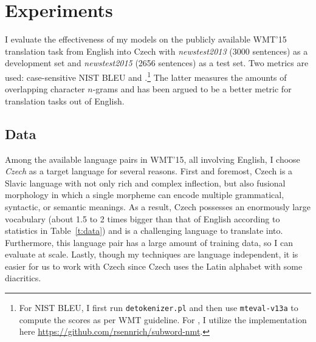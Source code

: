 \section{Experiments}
\label{sec:exp}
I evaluate the effectiveness of my models on the publicly available WMT'15
translation task from English into Czech with 
{\it newstest2013} (3000 sentences) as
a development set %
and {\it newstest2015} (2656 sentences) as a test set. Two metrics are used: case-sensitive NIST BLEU \cite{Papineni02bleu}
and \chr{} \cite{chrf}.\footnote{For NIST BLEU, I first run
\texttt{detokenizer.pl} %
and then use \texttt{mteval-v13a}
to compute the scores as per WMT guideline. For \chr{}, I utilize the implementation here
\url{https://github.com/rsennrich/subword-nmt}.}
The latter measures the amounts of overlapping character $n$-grams and has
been argued to be a better metric for translation tasks out of English.

\subsection{Data}
Among the available language pairs in WMT'15, all involving English, 
I choose {\it Czech} as a target language for several reasons. First and
foremost, Czech is a Slavic language with not only rich
and complex inflection,
but also fusional morphology in which a single morpheme can encode multiple
grammatical, syntactic, or semantic meanings. As a result, Czech possesses an enormously large
vocabulary (about 1.5 to 2 times bigger than that of English according to 
statistics in Table~\ref{t:data}) and is a challenging language to translate
into. Furthermore, this language pair has a large
amount of training data, so %
I can evaluate at scale. Lastly, though my techniques are language
independent, it is easier for us to work with Czech since Czech uses the Latin alphabet with some
diacritics. %

